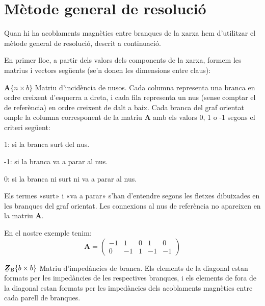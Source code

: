 \section{Mètode general de resolució}

Quan hi ha acoblaments
magnètics entre branques de la xarxa hem d'utilitzar el mètode
general de resolució, descrit a continuació.

En primer lloc, a partir dels valors dels components de la xarxa, formem les matrius i vectors següents (se'n donen les  dimensions entre claus):
\begin{list}{}
{\setlength{\labelwidth}{20mm} \setlength{\leftmargin}{22mm} \setlength{\labelsep}{2mm}}
   \item[$\boldsymbol{A}\{n\times b\}$] Matriu d'incidència de nusos. Cada columna representa una branca en ordre creixent d'esquerra a dreta, i cada fila representa un nus (sense comptar el de referència) en ordre creixent de dalt a baix. Cada branca del graf orientat omple la columna corresponent de la matriu $\boldsymbol{A}$ amb els valors 0, 1 o -1 segons el criteri següent:
   \begin{list}{}
   {\setlength{\labelwidth}{7mm} \setlength{\leftmargin}{9mm} \setlength{\labelsep}{2mm}}
      \item[1:]  si la branca surt del nus.
      \item[-1:] si la branca va a parar al nus.
      \item[0:]  si la branca ni surt ni va a parar al nus.
   \end{list}
   Els termes «surt» i «va a parar» s'han d'entendre segons les fletxes dibuixades en les branques del graf orientat. Les connexions al nus de referència no apareixen en la matriu $\boldsymbol{A}$.

   En el nostre exemple tenim:
   \[
      \boldsymbol{A} = \left(\begin{array}{rrrrr} -1 & 1  & 0 &  1 & 0 \\  0 & -1 & 1 & -1 & -1
                   \end{array} \right)
   \]

   \item[$\mcmplx{Z}\ped{B}\{b\times b\}$] Matriu d'impedàncies de branca. Els elements de la diagonal estan formats per les impedàncies de les respectives branques, i els elements de fora de la diagonal estan formats per les impedàncies dels acoblaments magnètics entre cada parell de branques.


\end{list}
